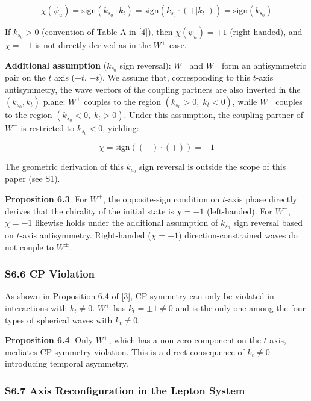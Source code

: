 \documentclass[
  a4paper,11pt]{article}
\theoremstyle{definition}
\theoremstyle{remark}
\begin{document}
\[\chi(\psi_u) = \mathrm{sign}(k_{s_0} \cdot k_t) = \mathrm{sign}(k_{s_0} \cdot (+|k_t|)) = \mathrm{sign}(k_{s_0})\]

If \(k_{s_0} > 0\) (convention of Table A in {[}4{]}), then
\(\chi(\psi_u) = +1\) (right-handed), and \(\chi = -1\) is not directly
derived as in the \(W^+\) case.

\textbf{Additional assumption} (\(k_{s_0}\) sign reversal): \(W^+\) and
\(W^-\) form an antisymmetric pair on the \(t\) axis (\(+t\), \(-t\)).
We assume that, corresponding to this \(t\)-axis antisymmetry, the wave
vectors of the coupling partners are also inverted in the
\((k_{s_0}, k_t)\) plane: \(W^+\) couples to the region
\((k_{s_0} > 0,\; k_t < 0)\), while \(W^-\) couples to the region
\((k_{s_0} < 0,\; k_t > 0)\). Under this assumption, the coupling
partner of \(W^-\) is restricted to \(k_{s_0} < 0\), yielding:

\[\chi = \mathrm{sign}((-) \cdot (+)) = -1\]

The geometric derivation of this \(k_{s_0}\) sign reversal is outside
the scope of this paper (see S1).

\textbf{Proposition 6.3}: For \(W^+\), the opposite-sign condition on
\(t\)-axis phase directly derives that the chirality of the initial
state is \(\chi = -1\) (left-handed). For \(W^-\), \(\chi = -1\)
likewise holds under the additional assumption of \(k_{s_0}\) sign
reversal based on \(t\)-axis antisymmetry. Right-handed (\(\chi = +1\))
direction-constrained waves do not couple to \(W^{\pm}\).

\subsubsection{S6.6 CP Violation}\label{s6.6-cp-violation}

As shown in Proposition 6.4 of {[}3{]}, CP symmetry can only be violated
in interactions with \(k_t \neq 0\). \(W^{\pm}\) has
\(k_t = \pm 1 \neq 0\) and is the only one among the four types of
spherical waves with \(k_t \neq 0\).

\textbf{Proposition 6.4}: Only \(W^{\pm}\), which has a non-zero
component on the \(t\) axis, mediates CP symmetry violation. This is a
direct consequence of \(k_t \neq 0\) introducing temporal asymmetry.

\subsubsection{S6.7 Axis Reconfiguration in the Lepton
System}\label{s6.7-axis-reconfiguration-in-the-lepton-system}
\end{document}
